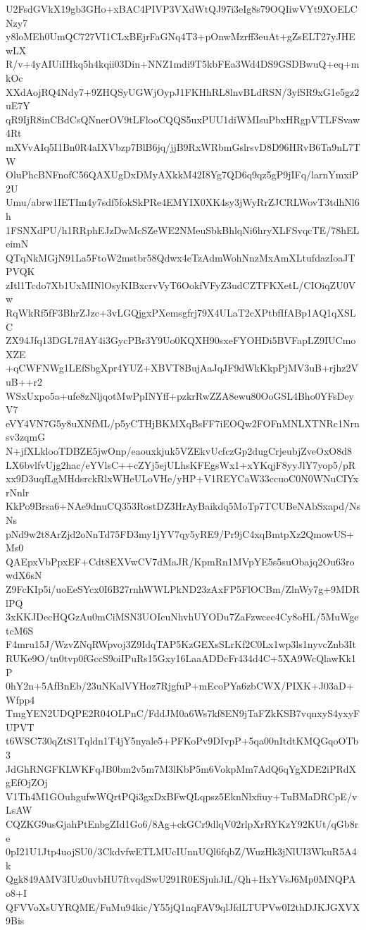U2FsdGVkX19gb3GHo+xBAC4PIVP3VXdWtQJ97i3eIg8s79OQIiwVYt9XOELCNzy7
y8loMEh0UmQC727VI1CLxBEjrFaGNq4T3+pOnwMzrff3euAt+gZsELT27yJHEwLX
R/v+4yAIUiIHkq5h4kqii03Din+NNZ1mdi9T5kbFEa3Wd4DS9GSDBwuQ+eq+mkOc
XXdAojRQ4Ndy7+9ZHQSyUGWjOypJ1FKHhRL8lnvBLdRSN/3yfSR9xG1e5gz2uE7Y
qR9IjR8inCBdCsQNnerOV9tLFlooCQQS5uxPUU1diWMIsuPbxHRgpVTLFSvaw4Rt
mXVvAIq5I1Bn0R4aIXVbzp7BlB6jq/jjB9RxWRbmGslrsvD8D96HRvB6Ta9nL7TW
OluPhcBNFnofC56QAXUgDxDMyAXkkM42I8Yg7QD6q9qz5gP9jIFq/larnYmxiP2U
Umu/abrw1IETIm4y7sdf5fokSkPRe4EMYIX0XK4sy3jWyRrZJCRLWovT3tdhNl6h
1FSNXdPU/h1RRphEJzDwMcSZeWE2NMeuSbkBhlqNi6hryXLFSvqcTE/78hELeimN
QTqNkMGjN91La5FtoW2mstbr58Qdwx4eTzAdmWohNnzMxAmXLtufdazIoaJTPVQK
zItl1Tcdo7Xb1UxMINlOsyKIBxcrvVyT6OokfVFyZ3udCZTFKXetL/CIOiqZU0Vw
RqWkRf5fF3BhrZJzc+3vLGQjgxPXemsgfrj79X4ULaT2cXPtbfIfABp1AQ1qXSLC
ZX94Jfq13DGL7flAY4i3GycPBr3Y9Uo0KQXH90sxeFYOHDi5BVFapLZ9IUCmoXZE
+qCWFNWg1LEfSbgXpr4YUZ+XBVT8BujAaJqJF9dWkKkpPjMV3uB+rjhz2VuB++r2
WSxUxpo5a+ufe8zNljqotMwPpINYff+pzkrRwZZA8ewu80OoGSL4Bho0YFsDeyV7
eVY4VN7G5y8uXNfML/p5yCTHjBKMXqBsFF7iEOQw2FOFnMNLXTNRc1Nrnsv3zqmG
N+jfXLklooTDBZE5jwOnp/eaouxkjuk5VZEkvUcfczGp2dugCrjeubjZveOxO8d8
LX6bvlfvUjg2hac/eYVlsC++cZYj5ejULhsKFEgsWx1+xYKqjF8yyJlY7yop5/pR
xx9D3uqfLgMHdsrckRlxWHeULoVHe/yHP+V1REYCaW33ccuoC0N0WNuCIYxrNnlr
KkPo9Brsa6+NAe9dnuCQ353RostDZ3HrAyBaikdq5MoTp7TCUBeNAbSxapd/NsNs
pNd9w2t8ArZjd2oNnTd75FD3my1jYV7qy5yRE9/Pr9jC4xqBmtpXz2QmowUS+Ms0
QAEpxVbPpxEF+Cdt8EXVwCV7dMaJR/KpmRn1MVpYE5s5suObajq2Ou63rowdX6sN
Z9FcKIp5i/uoEeSYcx0I6B27rnhWWLPkND23zAxFP5FlOCBm/ZlnWy7g+9MDRlPQ
3xKKJDecHQGzAu0mCiMSN3UOIcuNhvhUYODu7ZaFzwcec4Cy8oHL/5MuWgetcM6S
F4mru15J/WzvZNqRWpvoj3Z9IdqTAP5KzGEXsSLrKf2C0Lx1wp3ls1nyvcZnb3It
RUKe9O/tn0tvp0fGccS9oiIPuRs15Gxy16LaaADDcFr434d4C+5XA9WcQlawKk1P
0hY2n+5AfBnEb/23uNKalVYHoz7RjgfuP+mEcoPYa6zbCWX/PIXK+J03aD+Wfpp4
TmgYEN2UDQPE2R04OLPnC/FddJM0a6Ws7kf8EN9jTaFZkKSB7vqnxyS4yxyFUPVT
t6WSC730qZtS1Tqldn1T4jY5nyale5+PFKoPv9DIvpP+5qa00nItdtKMQGqoOTb3
JdGhRNGFKLWKFqJB0bm2v5m7M3lKbP5m6VokpMm7AdQ6qYgXDE2iPRdXgEfOjZOj
V1Th4M1GOuhgufwWQrtPQi3gxDxBFwQLqpsz5EknNlxfiuy+TuBMaDRCpE/vLsAW
CQZKG9usGjahPtEnbgZId1Go6/8Ag+ckGCr9dlqV02rlpXrRYKzY92KUt/qGb8re
0pI21U1Jtp4uojSU0/3CkdvfwETLMUcIUnnUQl6fqbZ/WuzHk3jNlUI3WkuR5A4k
Qgk849AMV3IUz0uvbHU7ftvqdSwU291R0ESjuhJiL/Qh+HxYVsJ6Mp0MNQPAo8+I
QFVVoXsUYRQME/FuMu94kic/Y55jQ1nqFAV9qlJfdLTUPVw0I2thDJKJGXVX9Bis
